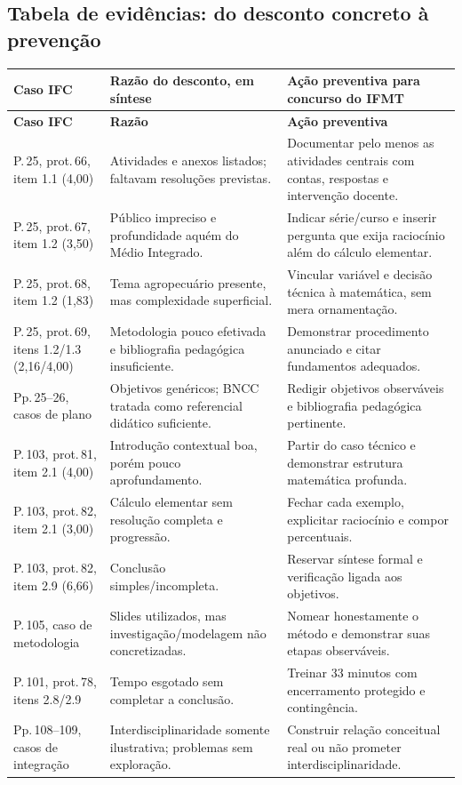\documentclass[11pt,a4paper]{article}
\begin{document}
\subsection{Tabela de evidências: do desconto concreto à prevenção}
\small
{}
\begin{longtable}{p{}p{}p{}}
\toprule
\textbf{Caso IFC} & \textbf{Razão do desconto, em síntese} & \textbf{Ação preventiva para concurso do IFMT}\\\midrule\endfirsthead
\toprule\textbf{Caso IFC}&\textbf{Razão}&\textbf{Ação preventiva}\\\midrule\endhead
P.\,25, prot.\,66, item 1.1 (4,00)&Atividades e anexos listados; faltavam resoluções previstas.&Documentar pelo menos as atividades centrais com contas, respostas e intervenção docente.\\
P.\,25, prot.\,67, item 1.2 (3,50)&Público impreciso e profundidade aquém do Médio Integrado.&Indicar série/curso e inserir pergunta que exija raciocínio além do cálculo elementar.\\
P.\,25, prot.\,68, item 1.2 (1,83)&Tema agropecuário presente, mas complexidade superficial.&Vincular variável e decisão técnica à matemática, sem mera ornamentação.\\
P.\,25, prot.\,69, itens 1.2/1.3 (2,16/4,00)&Metodologia pouco efetivada e bibliografia pedagógica insuficiente.&Demonstrar procedimento anunciado e citar fundamentos adequados.\\
Pp.\,25--26, casos de plano&Objetivos genéricos; BNCC tratada como referencial didático suficiente.&Redigir objetivos observáveis e bibliografia pedagógica pertinente.\\
P.\,103, prot.\,81, item 2.1 (4,00)&Introdução contextual boa, porém pouco aprofundamento.&Partir do caso técnico e demonstrar estrutura matemática profunda.\\
P.\,103, prot.\,82, item 2.1 (3,00)&Cálculo elementar sem resolução completa e progressão.&Fechar cada exemplo, explicitar raciocínio e compor percentuais.\\
P.\,103, prot.\,82, item 2.9 (6,66)&Conclusão simples/incompleta.&Reservar síntese formal e verificação ligada aos objetivos.\\
P.\,105, caso de metodologia&Slides utilizados, mas investigação/modelagem não concretizadas.&Nomear honestamente o método e demonstrar suas etapas observáveis.\\
P.\,101, prot.\,78, itens 2.8/2.9&Tempo esgotado sem completar a conclusão.&Treinar 33 minutos com encerramento protegido e contingência.\\
Pp.\,108--109, casos de integração&Interdisciplinaridade somente ilustrativa; problemas sem exploração.&Construir relação conceitual real ou não prometer interdisciplinaridade.\\
\bottomrule
\end{longtable}
\normalsize{}
\end{document}
